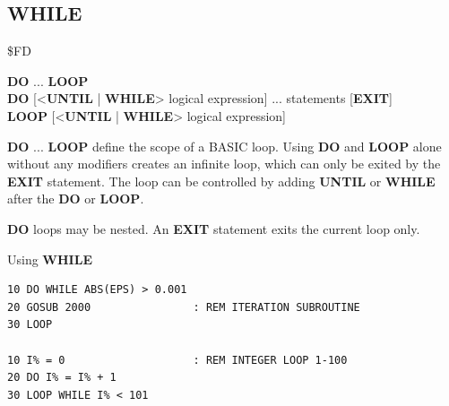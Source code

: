 \subsection{WHILE}
\begin{description}[leftmargin=2cm,style=nextline]
\item [Token:]    \$FD

\item [Format:]   {\bf DO} ... {\bf LOOP} \\
                  {\bf DO} [<{\bf UNTIL} | {\bf WHILE}> logical expression] ... statements [{\bf EXIT}] \\
                  {\bf LOOP} [<{\bf UNTIL} | {\bf WHILE}> logical expression]

\item [Usage:]    {\bf DO} ... {\bf LOOP} define the scope of a BASIC loop. Using {\bf DO} and {\bf LOOP} alone without any modifiers creates an infinite loop, which can only be exited by the {\bf EXIT} statement. The loop can be controlled by adding {\bf UNTIL} or {\bf WHILE} after the {\bf DO} or {\bf LOOP}.

\item [Remarks:]  {\bf DO} loops may be nested. An {\bf EXIT} statement exits the current loop only.

\item [Examples:] Using {\bf WHILE}

\begin{tcolorbox}[colback=black,coltext=white]
\verbatimfont{\codefont}
\begin{verbatim}
10 DO WHILE ABS(EPS) > 0.001
20 GOSUB 2000                : REM ITERATION SUBROUTINE
30 LOOP

10 I% = 0                    : REM INTEGER LOOP 1-100
20 DO I% = I% + 1
30 LOOP WHILE I% < 101
\end{verbatim}
\end{tcolorbox}
\end{description}


\newpage
